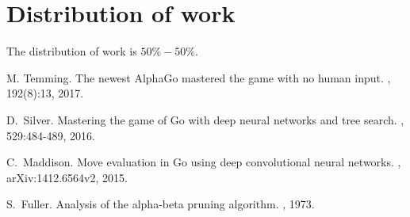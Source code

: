 \documentclass[11pt]{article}
\begin{document}
\section*{Distribution of work} The distribution of work is $50\% - 50\%$.
\newpage

\begin{thebibliography}{99}

\newblock M. Temming.
\newblock The newest AlphaGo mastered the game with no human input.
, 192(8):13, 2017.

\newblock D.~Silver.
\newblock Mastering the game of Go with deep neural networks and tree search.
, 529:484-489, 2016.

\newblock C.~Maddison.
\newblock Move evaluation in Go using deep convolutional neural networks.
, arXiv:1412.6564v2, 2015.

\newblock S.~Fuller.
\newblock Analysis of the alpha-beta pruning algorithm. 
, 1973.

\end{thebibliography}
\end{document}
